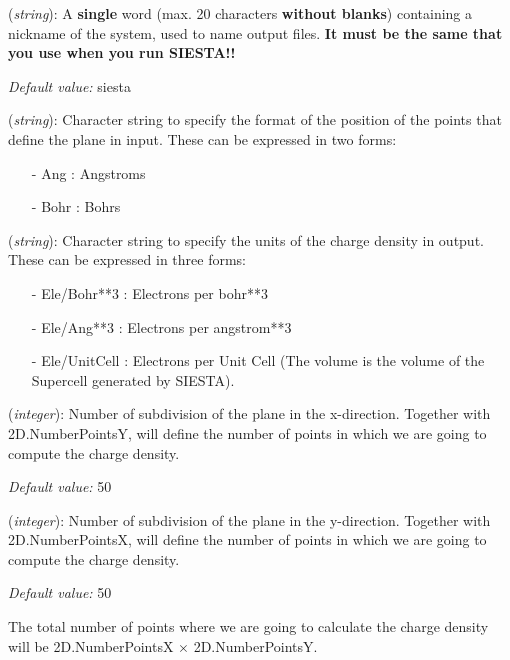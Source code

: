\begin{description}
\itemsep 10pt
\parsep 0pt

\item[{\bf SystemLabel}] ({\it string}): 
A {\bf single} word (max. 20 characters {\bf without blanks})
containing a nickname of the system, used to name output files. 
{\bf It must be the same that you use when you run SIESTA!!}

{\it Default value:} siesta

\item[{\bf 2D.CoorUnits}] ({\it string}): 
Character string to specify the format of the position of the points that
define the plane in input.
These can be expressed in two forms:

\begin{itemize}
\item[-] Ang        : Angstroms 
\item[-] Bohr       : Bohrs
\end{itemize}

\item[{\bf 2D.DensityUnits}] ({\it string}): 
Character string to specify the units of the charge density in output. 
These can be expressed in three forms:

\begin{itemize}
\item[-] Ele/Bohr**3      : Electrons per bohr**3
\item[-] Ele/Ang**3       : Electrons per angstrom**3
\item[-] Ele/UnitCell     : Electrons per Unit Cell (The volume is the volume
                            of the Supercell generated by SIESTA).
\end{itemize}


\item[{\bf 2D.NumberPointsX}] ({\it integer}):
 Number of subdivision of the plane in the x-direction. Together
 with 2D.NumberPointsY, will define the 
 number of points in which we are going to compute the charge density.

{\it Default value:} 50

\item[{\bf 2D.NumberPointsY}] ({\it integer}):
 Number of subdivision of the plane in the y-direction. Together
 with 2D.NumberPointsX, will define the 
 number of points in which we are going to compute the charge density.

{\it Default value:} 50

 The total number of points where we are going to calculate the charge density
 will be 2D.NumberPointsX $\times$ 2D.NumberPointsY.


\end{description}
